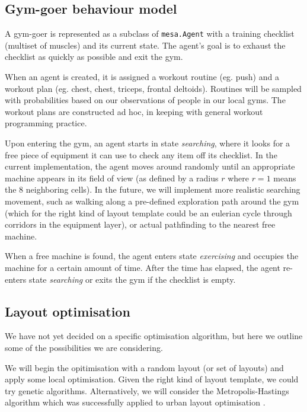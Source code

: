 \documentclass[9pt]{pnas-new}
\begin{document}
\subsection*{Gym-goer behaviour model}

A gym-goer is represented as a subclass of \texttt{mesa.Agent} with a training checklist (multiset of muscles) and its current state.  The agent's goal is to exhaust the checklist as quickly as possible and exit the gym.

When an agent is created, it is assigned a workout routine (eg. push) and a workout plan (eg. chest, chest, triceps, frontal deltoids). Routines will be sampled with probabilities based on our observations of people in our local gyms. The workout plans are constructed ad hoc, in keeping with general workout programming practice.

Upon entering the gym, an agent starts in state {\it searching}, where it looks for a free piece of equipment it can use to check  any item off its checklist. In the current implementation, the agent moves around randomly until an appropriate machine appears in its field of view (as defined by a radius $r$ where $r=1$ means the 8 neighboring cells).
In the future, we will implement more realistic searching movement, such as walking along a pre-defined exploration path around the gym (which for the right kind of layout template could be an eulerian cycle through corridors in the equipment layer), or actual pathfinding to the nearest free machine.

When a free machine is found, the agent enters state {\it exercising} and occupies the machine for a certain amount of time.
After the time has elapsed, the agent re-enters state {\it searching} or exits the gym if the checklist is empty.


\subsection*{Layout optimisation}

We have not yet decided on a specific optimisation algorithm, but here we outline some of the possibilities we are considering.

We will begin the opitimisation with a random layout (or set of layouts) and apply some local optimisation. Given the right kind of layout template, we could try genetic algorithms.
Alternatively, we will consider the Metropolis-Hastings algorithm which was successfully applied to urban layout optimisation \cite
{feng2016crowd_drive_layout_design,mathew2019urban_walkability}.
\end{document}
